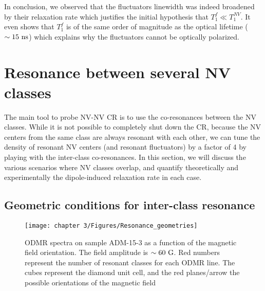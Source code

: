 \documentclass[a4paper, 11pt]{book}
\begin{document}
In conclusion, we observed that the fluctuators linewidth was indeed broadened by their relaxation rate which justifies the initial hypothesis that $T_1^f \ll T_1^{NV}$. It even shows that $T_1^f$ is of the same order of magnitude as the optical lifetime ($\sim 15\ \rm ns$) which explains why the fluctuators cannot be optically polarized.

\section{Resonance between several NV classes}

The main tool to probe NV-NV CR is to use the co-resonances between the NV classes. While it is not possible to completely shut down the CR, because the NV centers from the same class are always resonant with each other, we can tune the density of resonant NV centers (and resonant fluctuators) by a factor of 4 by playing with the inter-class co-resonances. In this section, we will discuss the various scenarios where NV classes overlap, and quantify theoretically and experimentally the dipole-induced relaxation rate in each case.

\subsection{Geometric conditions for inter-class resonance}

\begin{figure}[h!]
\centering
\texttt{[image: chapter 3/Figures/Resonance\_geometries]}
\caption{ODMR spectra on sample ADM-15-3 as a function of the magnetic field orientation. The field amplitude is $\sim 60\ \rm G$. Red numbers represent the number of resonant classes for each ODMR line. The cubes represent the diamond unit cell, and the red planes/arrow the possible orientations of the magnetic field}
\label{ODMR_geometries}
\end{figure}
\end{document}

